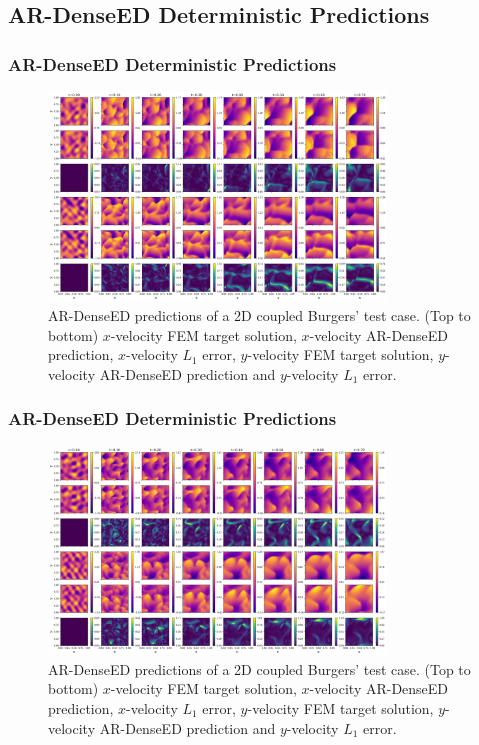 \documentclass{beamer}
\theoremstyle{remark}
\begin{document}
\subsection{AR-DenseED Deterministic Predictions}
\begin{frame}
\frametitle{AR-DenseED Deterministic Predictions}
%
\begin{figure}[H]
    \centering
    \includegraphics[width=0.8\textwidth]{Fig18.png}
    \caption{AR-DenseED predictions of a 2D coupled Burgers' test case. (Top to bottom) $x$-velocity FEM target solution, $x$-velocity AR-DenseED prediction, $x$-velocity $L_1$ error, $y$-velocity FEM target solution, $y$-velocity AR-DenseED prediction and $y$-velocity $L_1$ error.}
    \label{fig:burgers1D-ARDenseED-1}
\end{figure}

\end{frame}


\begin{frame}
\frametitle{AR-DenseED Deterministic Predictions}
%
\begin{figure}[H]
    \centering
    \includegraphics[width=0.8\textwidth]{Fig19.png}
    \caption{AR-DenseED predictions of a 2D coupled Burgers' test case. (Top to bottom) $x$-velocity FEM target solution, $x$-velocity AR-DenseED prediction, $x$-velocity $L_1$ error, $y$-velocity FEM target solution, $y$-velocity AR-DenseED prediction and $y$-velocity $L_1$ error.}
    \label{fig:burgers1D-ARDenseED-2}
\end{figure}
%
\end{frame}
\end{document}
